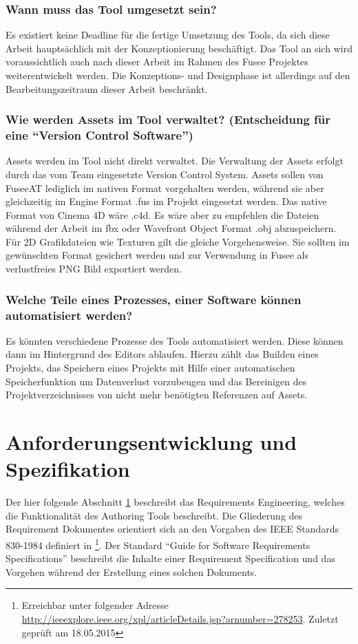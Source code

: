 \documentclass[pagesize, paper=a4, fontsize=12pt, titlepage=true, headings=small, headnosepline, abstractoff, liststotoc, nochapterprefix, plainheadsepline, twoside]{scrreprt}
\begin{document}
\subsubsection{Wann muss das Tool umgesetzt sein?}
Es existiert keine Deadline für die fertige Umsetzung des Tools, da sich diese Arbeit hauptsächlich mit der Konzeptionierung beschäftigt. Das Tool an sich wird voraussichtlich auch nach dieser Arbeit im Rahmen des Fusee Projektes weiterentwickelt werden. Die Konzeptions- und Designphase ist allerdings auf den Bearbeitungszeitraum dieser Arbeit beschränkt.

\subsubsection{Wie werden Assets im Tool verwaltet? (Entscheidung für eine “Version Control Software”)}
Assets werden im Tool nicht direkt verwaltet. Die Verwaltung der Assets erfolgt durch das vom Team eingesetzte Version Control System. Assets sollen von FuseeAT lediglich im nativen Format vorgehalten werden, während sie aber gleichzeitig im Engine Format .fus im Projekt eingesetzt werden. Das native Format von Cinema 4D wäre .c4d. Es wäre aber zu empfehlen die Dateien während der Arbeit im fbx oder Wavefront Object Format .obj abzuspeichern. Für 2D Grafikdateien wie Texturen gilt die gleiche Vorgehensweise. Sie sollten im gewünschten Format gesichert werden und zur Verwendung in Fusee als verlustfreies PNG Bild exportiert werden.

\subsubsection{Welche Teile eines Prozesses, einer Software können automatisiert werden?}
Es könnten verschiedene Prozesse des Tools automatisiert werden. Diese können dann im Hintergrund des Editors ablaufen. Hierzu zählt das Builden eines Projekts, das Speichern eines Projekts mit Hilfe einer automatischen Speicherfunktion um Datenverlust vorzubeugen und das Bereinigen des Projektverzeichnisses von nicht mehr benötigten Referenzen auf Assets.

\section{Anforderungsentwicklung und Spezifikation}\label{sec:RAD}
Der hier folgende Abschnitt \ref{sec:RAD} beschreibt das Requirements Engineering, welches die Funktionalität des Authoring Tools beschreibt. Die Gliederung des Requirement Dokumentes orientiert sich an den Vorgaben des IEEE Standards 830-1984 definiert in \footnote{Erreichbar unter folgender Adresse \url{http://ieeexplore.ieee.org/xpl/articleDetails.jsp?arnumber=278253}. Zuletzt geprüft am 18.05.2015}. Der Standard “Guide for Software Requirements Specifications” beschreibt die Inhalte einer Requirement Specification und das Vorgehen während der Erstellung eines solchen Dokuments.
\end{document}
